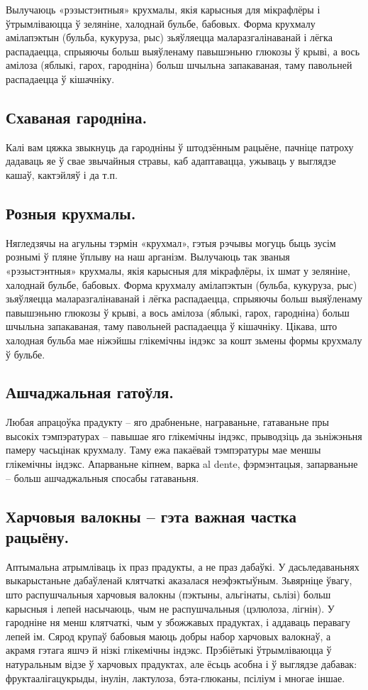 Вылучаюць «рэзыстэнтныя» крухмалы, якія карысныя для мікрафлёры і ўтрымліваюцца ў зеляніне, халоднай бульбе, бабовых. Форма крухмалу амілапэктын (бульба, кукуруза, рыс) зьяўляецца маларазгалінаванай і лёгка распадаецца, спрыяючы больш выяўленаму павышэньню глюкозы ў крыві, а вось амілоза (яблыкі, гарох, гародніна) больш шчыльна запакаваная, таму павольней распадаецца ў кішачніку.

\subsection{Схаваная гародніна.}
Калі вам цяжка звыкнуць да гародніны ў штодзённым рацыёне, пачніце патроху дадаваць яе ў свае звычайныя стравы, каб адаптавацца, ужываць у выглядзе кашаў, кактэйляў і да т.п.

\subsection{Розныя крухмалы.}
Нягледзячы на агульны тэрмін «крухмал», гэтыя рэчывы могуць быць зусім рознымі ў пляне ўплыву на наш арганізм. Вылучаюць так званыя «рэзыстэнтныя» крухмалы, якія карысныя для мікрафлёры, іх шмат у зеляніне, халоднай бульбе, бабовых. Форма крухмалу амілапэктын (бульба, кукуруза, рыс) зьяўляецца маларазгалінаванай і лёгка распадаецца, спрыяючы больш выяўленаму павышэньню глюкозы ў крыві, а вось амілоза (яблыкі, гарох, гародніна) больш шчыльна запакаваная, таму павольней распадаецца ў кішачніку. Цікава, што халодная бульба мае ніжэйшы глікемічны індэкс за кошт зьмены формы крухмалу ў бульбе.

\subsection{Ашчаджальная гатоўля.}
Любая апрацоўка прадукту – яго драбненьне, награваньне, гатаваньне пры высокіх тэмпэратурах – павышае яго глікемічны індэкс, прыводзіць да зьніжэньня памеру часьцінак крухмалу. Таму ежа пакаёвай тэмпэратуры мае меншы глікемічны індэкс. Апарваньне кіпнем, варка al dente, фэрмэнтацыя, запарваньне – больш ашчаджальныя спосабы гатаваньня.

\subsection{Харчовыя валокны – гэта важная частка рацыёну.}
Аптымальна атрымліваць іх праз прадукты, а не праз дабаўкі. У дасьледаваньнях выкарыстаньне дабаўленай клятчаткі аказалася неэфэктыўным. Зьвярніце ўвагу, што распушчальныя харчовыя валокны (пэктыны, альгінаты, сьлізі) больш карысныя і лепей насычаюць, чым не распушчальныя (цэлюлоза, лігнін). У гародніне ня менш клятчаткі, чым у збожжавых прадуктах, і аддаваць перавагу лепей ім. Сярод крупаў бабовыя маюць добры набор харчовых валокнаў, а акрамя гэтага яшчэ й нізкі глікемічны індэкс. Прэбіётыкі ўтрымліваюцца ў натуральным відзе ў харчовых прадуктах, але ёсьць асобна і ў выглядзе дабавак: фруктаалігацукрыды, інулін, лактулоза, бэта-глюканы, псіліум і многае іншае.

